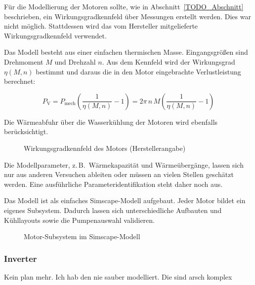 Für die Modellierung der Motoren sollte, wie in Abschnitt~\ref{TODO_Abschnitt}
beschrieben, ein Wirkungsgradkennfeld über Messungen erstellt werden. Dies war
nicht möglich. Stattdessen wird das vom Hersteller mitgelieferte
Wirkungsgradkennfeld verwendet.

Das Modell besteht aus einer einfachen thermischen Masse. Eingangsgrößen sind
Drehmoment $M$ und Drehzahl $n$. Aus dem Kennfeld wird der Wirkungsgrad
$\eta(M,n)$ bestimmt und daraus die in den Motor eingebrachte Verlustleistung
berechnet:

\begin{equation}
    P_\mathrm{V} = P_\mathrm{mech} \left( \frac{1}{\eta(M,n)} - 1 \right)
                 = 2\pi\, n\, M \left( \frac{1}{\eta(M,n)} - 1 \right)
    \label{eq:verlustleistung_motor}
\end{equation}

Die Wärmeabfuhr über die Wasserkühlung der Motoren wird ebenfalls
berücksichtigt.

\begin{figure}[htbp]
    \centering
    \caption{Wirkungsgradkennfeld des Motors (Herstellerangabe)}
    \label{fig:motor_kennfeld}
\end{figure}

Die Modellparameter, z.\,B.\ Wärmekapazität und Wärmeübergänge, lassen sich
nur aus anderen Versuchen ableiten oder müssen an vielen Stellen geschätzt
werden. Eine ausführliche Parameteridentifikation steht daher noch aus.

Das Modell ist als einfaches Simscape-Modell aufgebaut. Jeder Motor bildet ein
eigenes Subsystem. Dadurch lassen sich unterschiedliche Aufbauten und
Kühllayouts sowie die Pumpenauswahl validieren.

\begin{figure}[htbp]
    \centering
    \caption{Motor-Subsystem im Simscape-Modell}
    \label{fig:motor_subsystem}
\end{figure}

\subsubsection{Inverter}
Kein plan mehr. Ich hab den nie sauber modelliert. Die sind arsch komplex

